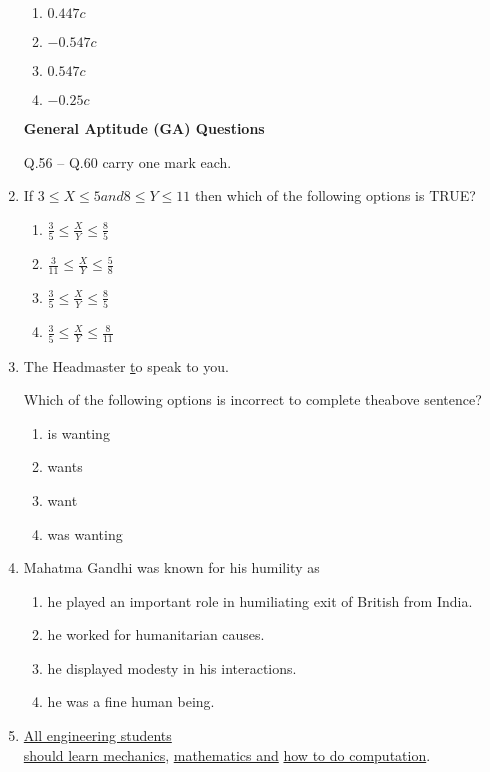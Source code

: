 \documentclass[journal]{IEEEtran}
\newcommand{\questionref}[1]{{ #1}}
\begin{document}
\begin{enumerate}
\begin{enumerate}
    \item $0.447c$
    \item $-0.547c$
    \item $0.547c$
    \item $-0.25c$\\
\end{enumerate}

\textbf{General Aptitude (GA) Questions}

\questionref{Q.56} -- \questionref{Q.60} carry one mark each.\\

\item \label{Q.56} If $3 \leq X \leq 5 and 8 \leq Y \leq 11$ then which of the following options is TRUE?

\begin{enumerate}
    \item $\frac{3}{5} \leq \frac{X}{Y} \leq \frac{8}{5}$
    \item $\frac{3}{11} \leq \frac{X}{Y} \leq \frac{5}{8}$
    \item $\frac{3}{5} \leq \frac{X}{Y} \leq \frac{8}{5}$
    \item $\frac{3}{5} \leq \frac{X}{Y} \leq \frac{8}{11}$\\
\end{enumerate}

\item \label{Q.57} The Headmaster \underline to speak to you.

Which of the following options is incorrect to complete theabove sentence?

\begin{enumerate}
    \item is wanting
    \item wants
    \item want
    \item was wanting\\
\end{enumerate}

\item \label{Q.58} Mahatma Gandhi was known for his humility as

\begin{enumerate}
    \item he played an important role in humiliating exit of British from India.
    \item he worked for humanitarian causes.
    \item he displayed modesty in his interactions.
    \item he was a fine human being.\\
\end{enumerate}
\item \label{Q.59} \underline{All engineering students} \\ \underline{should learn mechanics}, \underline{mathematics and}  \underline{how to do computation}.


\end{enumerate}
\end{document}
